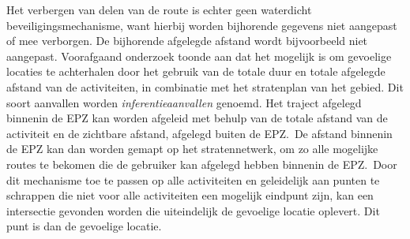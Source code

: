 Het verbergen van delen van de route is echter geen waterdicht
beveiligingsmechanisme, want hierbij worden bijhorende gegevens niet aangepast
of mee verborgen. De bijhorende afgelegde afstand wordt bijvoorbeeld niet
aangepast. Voorafgaand onderzoek toonde aan dat het mogelijk is om gevoelige
locaties te achterhalen door het gebruik van de totale duur en totale afgelegde
afstand van de activiteiten, in combinatie met het stratenplan van het gebied.
Dit soort aanvallen worden \textit{inferentieaanvallen} genoemd. Het traject
afgelegd binnenin de EPZ kan worden afgeleid met behulp van de totale afstand
van de activiteit en de zichtbare afstand, afgelegd buiten de EPZ.\ De afstand
binnenin de EPZ kan dan worden gemapt op het stratennetwerk, om zo alle
mogelijke routes te bekomen die de gebruiker kan afgelegd hebben binnenin de
EPZ.\ Door dit mechanisme toe te passen op alle activiteiten en geleidelijk aan
punten te schrappen die niet voor alle activiteiten een mogelijk eindpunt zijn,
kan een intersectie gevonden worden die uiteindelijk de gevoelige locatie
oplevert. Dit punt is dan de gevoelige locatie.

